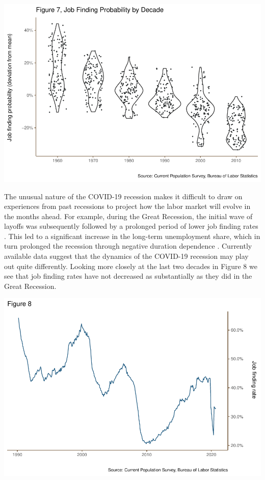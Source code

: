 \documentclass[
  11pt,
]{article}
\begin{document}
\begin{center}\includegraphics{JOLTS_files/figure-latex/unnamed-chunk-11-1} \end{center}

The unusual nature of the COVID-19 recession makes it difficult to draw
on experiences from past recessions to project how the labor market will
evolve in the months ahead. For example, during the Great Recession, the
initial wave of layoffs was subsequently followed by a prolonged period
of lower job finding rates \citep{elsby09}. This led to a significant
increase in the long-term unemployment share, which in turn prolonged
the recession through negative duration dependence \citep{krueger14}.
Currently available data suggest that the dynamics of the COVID-19
recession may play out quite differently. Looking more closely at the
last two decades in Figure 8 we see that job finding rates have not
decreased as substantially as they did in the Great Recession.

\begin{center}\includegraphics{JOLTS_files/figure-latex/unnamed-chunk-12-1} \end{center}
\end{document}
